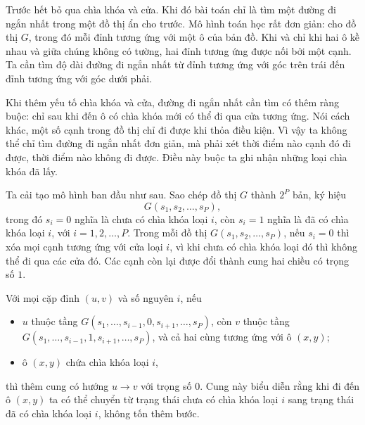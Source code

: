 \documentclass[11pt]{article}
\begin{document}
Trước hết bỏ qua chìa khóa và cửa. Khi đó bài toán chỉ là tìm một đường đi
ngắn nhất trong một đồ thị ẩn cho trước. Mô hình toán học rất đơn giản: cho
đồ thị $G$, trong đó mỗi đỉnh tương ứng với một ô của bản đồ. Khi và chỉ khi
hai ô kề nhau và giữa chúng không có tường, hai đỉnh tương ứng được nối bởi
một cạnh. Ta cần tìm độ dài đường đi ngắn nhất từ đỉnh tương ứng với góc trên
trái đến đỉnh tương ứng với góc dưới phải.

\begin{center}
\end{center}

Khi thêm yếu tố chìa khóa và cửa, đường đi ngắn nhất cần tìm có thêm ràng
buộc: chỉ sau khi đến ô có chìa khóa mới có thể đi qua cửa tương ứng. Nói
cách khác, một số cạnh trong đồ thị chỉ đi được khi thỏa điều kiện. Vì vậy ta
không thể chỉ tìm đường đi ngắn nhất đơn giản, mà phải xét thời điểm nào cạnh
đó đi được, thời điểm nào không đi được. Điều này buộc ta ghi nhận những loại
chìa khóa đã lấy.

Ta cải tạo mô hình ban đầu như sau. Sao chép đồ thị $G$ thành $2^P$ bản, ký
hiệu
\[
  G(s_1,s_2,\ldots,s_P),
\]
trong đó $s_i=0$ nghĩa là chưa có chìa khóa loại $i$, còn $s_i=1$ nghĩa là đã
có chìa khóa loại $i$, với $i=1,2,\ldots,P$. Trong mỗi đồ thị
$G(s_1,s_2,\ldots,s_P)$, nếu $s_i=0$ thì xóa mọi cạnh tương ứng với cửa loại
$i$, vì khi chưa có chìa khóa loại đó thì không thể đi qua các cửa đó. Các
cạnh còn lại được đổi thành cung hai chiều có trọng số $1$.

Với mọi cặp đỉnh $(u,v)$ và số nguyên $i$, nếu
\begin{itemize}
  \item $u$ thuộc tầng $G(s_1,\ldots,s_{i-1},0,s_{i+1},\ldots,s_P)$, còn $v$
  thuộc tầng $G(s_1,\ldots,s_{i-1},1,s_{i+1},\ldots,s_P)$, và cả hai cùng
  tương ứng với ô $(x,y)$;
  \item ô $(x,y)$ chứa chìa khóa loại $i$,
\end{itemize}
thì thêm cung có hướng $u\to v$ với trọng số $0$. Cung này biểu diễn rằng khi
đi đến ô $(x,y)$ ta có thể chuyển từ trạng thái chưa có chìa khóa loại $i$
sang trạng thái đã có chìa khóa loại $i$, không tốn thêm bước.
\end{document}
